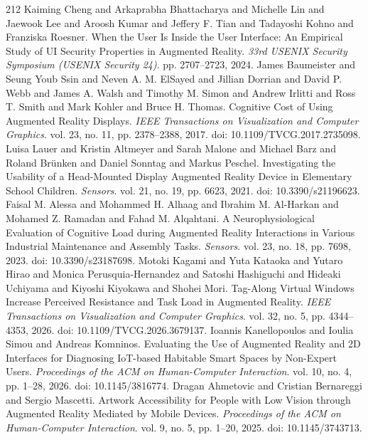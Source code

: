 \begin{thebibliography}{212}
 Kaiming Cheng and Arkaprabha Bhattacharya and Michelle Lin and Jaewook Lee and Aroosh Kumar and Jeffery F. Tian and Tadayoshi Kohno and Franziska Roesner. When the User Is Inside the User Interface: An Empirical Study of {UI} Security Properties in Augmented Reality. \emph{33rd USENIX Security Symposium (USENIX Security 24)}. pp. 2707--2723, 2024.
 James Baumeister and Seung Youb Ssin and Neven A. M. ElSayed and Jillian Dorrian and David P. Webb and James A. Walsh and Timothy M. Simon and Andrew Irlitti and Ross T. Smith and Mark Kohler and Bruce H. Thomas. Cognitive Cost of Using Augmented Reality Displays. \emph{IEEE Transactions on Visualization and Computer Graphics}. vol. 23, no. 11, pp. 2378--2388, 2017. doi: 10.1109/TVCG.2017.2735098.
 Luisa Lauer and Kristin Altmeyer and Sarah Malone and Michael Barz and Roland Br{\"u}nken and Daniel Sonntag and Markus Peschel. Investigating the Usability of a Head-Mounted Display Augmented Reality Device in Elementary School Children. \emph{Sensors}. vol. 21, no. 19, pp. 6623, 2021. doi: 10.3390/s21196623.
 Faisal M. Alessa and Mohammed H. Alhaag and Ibrahim M. Al-Harkan and Mohamed Z. Ramadan and Fahad M. Alqahtani. A Neurophysiological Evaluation of Cognitive Load during Augmented Reality Interactions in Various Industrial Maintenance and Assembly Tasks. \emph{Sensors}. vol. 23, no. 18, pp. 7698, 2023. doi: 10.3390/s23187698.
 Motoki Kagami and Yuta Kataoka and Yutaro Hirao and Monica Perusquia-Hernandez and Satoshi Hashiguchi and Hideaki Uchiyama and Kiyoshi Kiyokawa and Shohei Mori. Tag-Along Virtual Windows Increase Perceived Resistance and Task Load in Augmented Reality. \emph{IEEE Transactions on Visualization and Computer Graphics}. vol. 32, no. 5, pp. 4344--4353, 2026. doi: 10.1109/TVCG.2026.3679137.
 Ioannis Kanellopoulos and Ioulia Simou and Andreas Komninos. Evaluating the Use of Augmented Reality and 2D Interfaces for Diagnosing IoT-based Habitable Smart Spaces by Non-Expert Users. \emph{Proceedings of the ACM on Human-Computer Interaction}. vol. 10, no. 4, pp. 1--28, 2026. doi: 10.1145/3816774.
 Dragan Ahmetovic and Cristian Bernareggi and Sergio Mascetti. Artwork Accessibility for People with Low Vision through Augmented Reality Mediated by Mobile Devices. \emph{Proceedings of the ACM on Human-Computer Interaction}. vol. 9, no. 5, pp. 1--20, 2025. doi: 10.1145/3743713.

\end{thebibliography}
